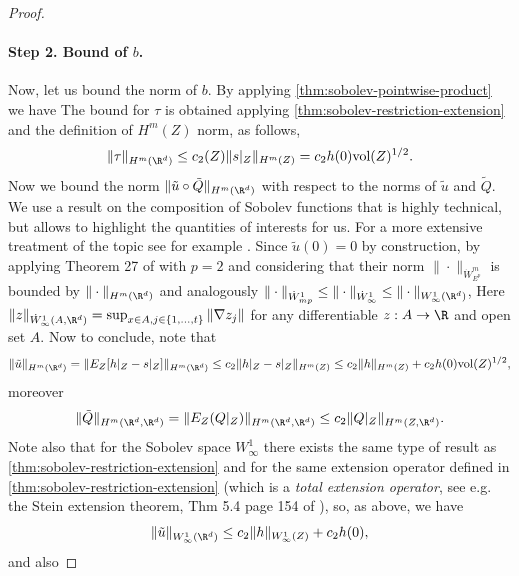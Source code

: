 \begin{proof}
\paragraph{Step 2. Bound of $b$.}
Now, let us bound the norm of $b$. By applying \cref{thm:sobolev-pointwise-product} we have
The bound for $\tau$ is obtained applying \cref{thm:sobolev-restriction-extension} and the definition of $H^m(Z)$ norm, as follows,
$$\|\tau\|_{H^m(\R^d)} \leq c_2(Z) \|s|_Z\|_{H^m(Z)} = c_2 h(0) \textrm{vol}(Z)^{1/2}.$$
Now we bound the norm $\|\tilde{u} \circ \tilde{Q}\|_{H^m(\R^d)}$ with respect to the norms of $\tilde{u}$ and $\tilde{Q}$. We use a result on the composition of Sobolev functions \citep[][Theorem 27]{bourdaud2011composition} that is highly technical, but allows to highlight the quantities of interests for us. For a more extensive treatment of the topic see for example \citet{runst2011sobolev}. Since $\tilde{u}(0) = 0$ by construction, by applying Theorem 27 of \citet{bourdaud2011composition} with $p=2$ and considering that their norm $\|\cdot\|_{\dot{W}_{E^p}^m}$ is bounded by $\|\cdot\|_{H^m(\R^d)}$ and analogously $\|\cdot\|_{\dot{W}^1_{mp}} \leq \|\cdot\|_{\dot{W}^1_{\infty}} \leq \|\cdot\|_{W^1_\infty(\R^d)}$,
Here $\|z\|_{\dot{W}^1_\infty(A, \R^d)} = \sup_{x \in A, j \in \{1,\dots,t\}} \|\nabla z_j\|$ for any differentiable $z:A \to \R$ and open set $A$.
Now to conclude, note that
$$\|\tilde{u}\|_{H^m(\R^d)} = \|E_{Z}[h|_Z - s|_Z]\|_{H^m(\R^d)} \leq c_2 \|h|_Z - s|_Z\|_{H^m(Z)} \leq c_2 \|h\|_{H^m(Z)} + c_2 h(0) \textrm{vol}(Z)^{1/2},$$
moreover
$$\|\tilde{Q}\|_{H^m(\R^d,\R^d)} = \|E_Z(Q|_Z)\|_{H^m(\R^d, \R^d)} \leq c_2 \|Q|_Z\|_{H^m(Z, \R^d)}.$$
Note also that for the Sobolev space $W^1_\infty$ there exists the same type of result as \cref{thm:sobolev-restriction-extension} and for the same extension operator defined in \cref{thm:sobolev-restriction-extension} (which is a {\em total extension operator}, see e.g. the Stein extension theorem, Thm 5.4 page 154 of \citealp{adams2003sobolev}), so, as above, we have
$$\|\tilde{u}\|_{W^1_\infty(\R^d)} \leq c_2 \|h\|_{W^1_\infty(Z)} + c_2 h(0),$$
and also
\end{proof}
